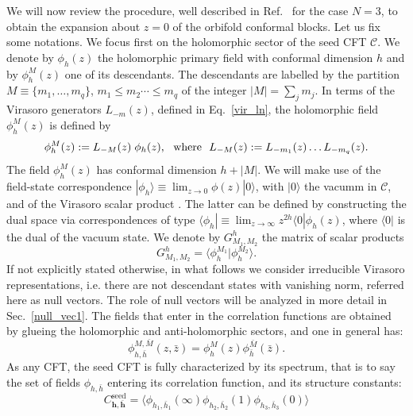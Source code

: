 \documentclass[a4paper,11pt]{article}
\begin{document}
We will now review the procedure, well described in Ref.~\cite{Collier} for the case $N=3$, to obtain the expansion about $z=0$ of the orbifold conformal blocks.  Let us fix some notations. We focus first on the holomorphic sector of the seed CFT $\mathcal{C}$. We denote by $\phi_{h}(z)$  the holomorphic primary field with conformal dimension $h$  and by $\phi_{h}^{M}(z)$ one of its descendants. The descendants are labelled by the partition  $M\equiv\{m_1,\dots,m_q\}$, $m_1\leq m_2\cdots\leq m_q$ of the integer  $|M|=\sum_{j} m_j$. In terms of the  Virasoro generators $L_{-m}(z)$, defined in Eq.~\eqref{vir_ln}, the holomorphic field $\phi_{h}^{M}(z)$ is defined by
\begin{equation}
\label{desc}
 \phi_{h}^{M}(z):=L_{-M}(z)\;\phi_h(z),~~{\rm{where}}~~ L_{-M}(z):=L_{-m_1}(z)\dots L_{-m_q}(z).
 \end{equation}
The field  $\phi_{h}^{M}(z)$ has conformal dimension $h+|M|$. We will make use of the field-state correspondence $|\phi_{h}\rangle\equiv \lim_{z\to 0}\phi(z)|0\rangle$, with $|0\rangle$ the vacumm in $\mathcal{C}$, and of the Virasoro scalar product \cite{DiFrancesco}. 
The latter can be defined  by constructing the dual space  via correspondences of type  $\langle \phi_{h} |\equiv\lim_{z\rightarrow\infty}z^{2h}\langle 0|\phi_h(z)$, where $\langle 0|$ is the dual of the vacuum state. We denote by  $G^{h}_{M_1,M_2}$ the matrix of scalar products
\begin{equation}
G^{h}_{M_1,M_2} = \langle \phi_{h}^{M_1}|\phi_{h}^{M_2}\rangle. 
\end{equation}
If not explicitly stated otherwise, in what follows we consider irreducible Virasoro representations, i.e. there are not descendant states with vanishing norm, referred here as null vectors. The role of null vectors will be analyzed in more detail in Sec.~\ref{null_vec1}.  The fields that enter in the correlation functions are obtained by glueing the holomorphic and anti-holomorphic sectors, and one in general has:
\begin{equation}
\phi^{M,\bar{M}}_{h,\bar{h}} (z,\bar{z})=\phi^{M}_{h}(z)\phi^{\bar{M}}_{\bar{h}}(\bar{z}).
\end{equation} 
As any CFT, the seed CFT is fully characterized by its spectrum, that is to say the set of fields $\phi_{h,\bar{h}}$ entering its correlation function, and its structure constants:
\begin{equation}
\label{Cseed}
C^{\text{seed}}_{\boldsymbol{h},\bar{\boldsymbol{h}}}=\langle \phi_{h_1,\bar{h}_1}(\infty)\phi_{h_2,\bar{h}_2}(1)\phi_{h_3,\bar{h}_3}(0)\rangle
\end{equation}
\end{document}
